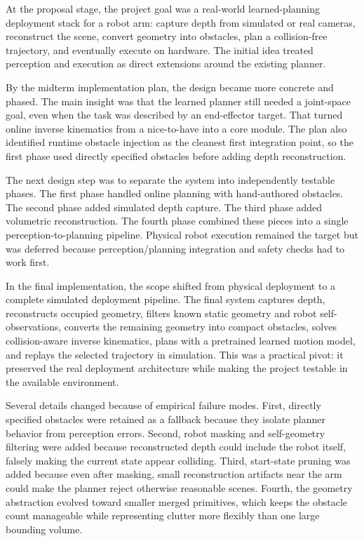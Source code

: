 \documentclass[11pt]{article}
\begin{document}
At the proposal stage, the project goal was a real-world learned-planning deployment stack for a robot arm: capture depth from simulated or real cameras, reconstruct the scene, convert geometry into obstacles, plan a collision-free trajectory, and eventually execute on hardware. The initial idea treated perception and execution as direct extensions around the existing planner.

By the midterm implementation plan, the design became more concrete and phased. The main insight was that the learned planner still needed a joint-space goal, even when the task was described by an end-effector target. That turned online inverse kinematics from a nice-to-have into a core module. The plan also identified runtime obstacle injection as the cleanest first integration point, so the first phase used directly specified obstacles before adding depth reconstruction.

The next design step was to separate the system into independently testable phases. The first phase handled online planning with hand-authored obstacles. The second phase added simulated depth capture. The third phase added volumetric reconstruction. The fourth phase combined these pieces into a single perception-to-planning pipeline. Physical robot execution remained the target but was deferred because perception/planning integration and safety checks had to work first.

In the final implementation, the scope shifted from physical deployment to a complete simulated deployment pipeline. The final system captures depth, reconstructs occupied geometry, filters known static geometry and robot self-observations, converts the remaining geometry into compact obstacles, solves collision-aware inverse kinematics, plans with a pretrained learned motion model, and replays the selected trajectory in simulation. This was a practical pivot: it preserved the real deployment architecture while making the project testable in the available environment.

Several details changed because of empirical failure modes. First, directly specified obstacles were retained as a fallback because they isolate planner behavior from perception errors. Second, robot masking and self-geometry filtering were added because reconstructed depth could include the robot itself, falsely making the current state appear colliding. Third, start-state pruning was added because even after masking, small reconstruction artifacts near the arm could make the planner reject otherwise reasonable scenes. Fourth, the geometry abstraction evolved toward smaller merged primitives, which keeps the obstacle count manageable while representing clutter more flexibly than one large bounding volume.
\end{document}

